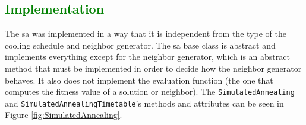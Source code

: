 \subsection{\textcolor{green}{Implementation}}

The \gls{sa} was implemented in a way that it is independent from the type of the cooling schedule and neighbor generator. The \gls{sa} base class is abstract and implements everything except for the neighbor generator, which is an abstract method that must be implemented in order to decide how the neighbor generator behaves. It also does not implement the evaluation function (the one that computes the fitness value of a solution or neighbor). The \verb+SimulatedAnnealing+ and \verb+SimulatedAnnealingTimetable+'s methods and attributes can be seen in Figure \ref{fig:SimulatedAnnealing}.\\
\\
